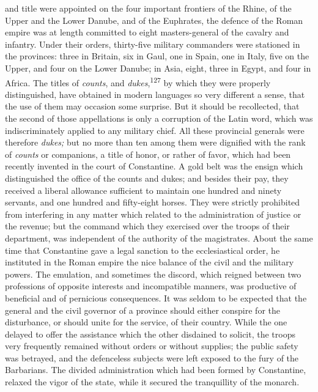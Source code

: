 and title were appointed on the four important frontiers of the
Rhine, of the Upper and the Lower Danube, and of the Euphrates,
the defence of the Roman empire was at length committed to eight
masters-general of the cavalry and infantry. Under their orders,
thirty-five military commanders were stationed in the provinces:
three in Britain, six in Gaul, one in Spain, one in Italy, five
on the Upper, and four on the Lower Danube; in Asia, eight, three
in Egypt, and four in Africa. The titles of \textit{counts}, and
\textit{dukes},\textsuperscript{127} by which they were properly distinguished, have
obtained in modern languages so very different a sense, that the
use of them may occasion some surprise. But it should be
recollected, that the second of those appellations is only a
corruption of the Latin word, which was indiscriminately applied
to any military chief. All these provincial generals were
therefore \textit{dukes;} but no more than ten among them were dignified
with the rank of \textit{counts} or companions, a title of honor, or
rather of favor, which had been recently invented in the court of
Constantine. A gold belt was the ensign which distinguished the
office of the counts and dukes; and besides their pay, they
received a liberal allowance sufficient to maintain one hundred
and ninety servants, and one hundred and fifty-eight horses. They
were strictly prohibited from interfering in any matter which
related to the administration of justice or the revenue; but the
command which they exercised over the troops of their department,
was independent of the authority of the magistrates. About the
same time that Constantine gave a legal sanction to the
ecclesiastical order, he instituted in the Roman empire the nice
balance of the civil and the military powers. The emulation, and
sometimes the discord, which reigned between two professions of
opposite interests and incompatible manners, was productive of
beneficial and of pernicious consequences. It was seldom to be
expected that the general and the civil governor of a province
should either conspire for the disturbance, or should unite for
the service, of their country. While the one delayed to offer the
assistance which the other disdained to solicit, the troops very
frequently remained without orders or without supplies; the
public safety was betrayed, and the defenceless subjects were
left exposed to the fury of the Barbarians. The divided
administration which had been formed by Constantine, relaxed the
vigor of the state, while it secured the tranquillity of the
monarch.


